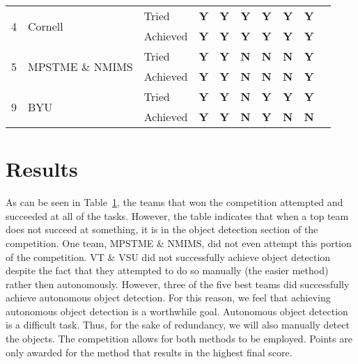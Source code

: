 \documentclass[]{auvsi_doc}
\begin{document}
\begin{table}[h!]
\begin{tabular}{ cllccccccc }
		\hline
		\multirow{2}{*}{4} 		& \multirow{2}{*}{Cornell} 				& Tried		& \color{dg}\textbf{Y} 	& \color{dg}\textbf{Y}  	& \color{dg}\textbf{Y} 	& \color{dg}\textbf{Y} 	& \color{dg}\textbf{Y}  	& \color{dg}\textbf{Y}  \\	 	  	
							&  								& Achieved	& \color{dg}\textbf{Y} 	& \color{dg}\textbf{Y}  	& \color{dg}\textbf{Y} 	& \color{dg}\textbf{Y} 	& \color{dg}\textbf{Y}  	& \color{dg}\textbf{Y}  \\		
		\hline
		\multirow{2}{*}{5} 		& \multirow{2}{*}{MPSTME \& NMIMS} 	& Tried		& \color{dg}\textbf{Y} 	& \color{dg}\textbf{Y}  	& \color{red}\textbf{N} 	& \color{red}\textbf{N} 	& \color{red}\textbf{N}  	& \color{dg}\textbf{Y}  \\
							&  							   	& Achieved	& \color{dg}\textbf{Y} 	& \color{dg}\textbf{Y}  	& \color{red}\textbf{N} 	& \color{red}\textbf{N} 	& \color{red}\textbf{N}  	& \color{dg}\textbf{Y}  \\		
		\hline
		\multirow{2}{*}{9} 		& \multirow{2}{*}{BYU} 				& Tried		& \color{dg}\textbf{Y} 	& \color{dg}\textbf{Y}  	& \color{red}\textbf{N} 	& \color{dg}\textbf{Y} 	& \color{dg}\textbf{Y}  	& \color{dg}\textbf{Y}  \\
							&  								& Achieved	& \color{dg}\textbf{Y} 	& \color{dg}\textbf{Y}  	& \color{red}\textbf{N} 	& \color{dg}\textbf{Y} 	& \color{red}\textbf{N}  	& \color{red}\textbf{N}  \\
		\hline
	\end{tabular}
	\label{table:benchmark}
\end{table}

\section{Results}

As can be seen in Table~\ref{table:benchmark}, the teams that won the competition attempted and succeeded at all of the tasks. However, the table indicates that when a top team does not succeed at something, it is in the object detection section of the competition. One team, MPSTME \& NMIMS, did not even attempt this portion of the competition. VT \& VSU did not successfully achieve object detection despite the fact that they attempted to do so manually (the easier method) rather then autonomously. However, three of the five best teams did successfully achieve autonomous object detection. For this reason, we feel that achieving autonomous object detection is a worthwhile goal. Autonomous object detection is a difficult task. Thus, for the sake of redundancy, we will also manually detect the objects. The competition allows for both methods to be employed. Points are only awarded for the method that results in the highest final score.
\end{document}

